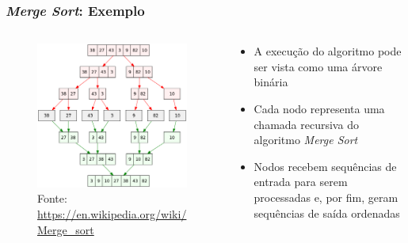 \documentclass[aspectratio=169]{beamer}
\begin{document}
\begin{frame}\frametitle{\emph{Merge Sort}: Exemplo}
\begin{columns}[T]
\begin{column}{0.6\linewidth}
\vspace{-3mm}
\begin{figure}[h]
	\centering
	\includegraphics[height=0.7\paperheight]{imagens/mergesort.png}\\
	\tiny{Fonte: \url{https://en.wikipedia.org/wiki/Merge_sort}}
\end{figure}
\end{column}
\begin{column}{0.4\linewidth}
\vspace{3mm}
\begin{itemize}
	\item A execução do algoritmo pode ser vista como uma árvore binária
	\item Cada nodo representa uma chamada recursiva do algoritmo \emph{Merge Sort}
	\item Nodos recebem sequências de entrada para serem processadas e, por fim, geram sequências de saída ordenadas
\end{itemize}
\end{column}
\end{columns}
\end{frame}
\end{document}
